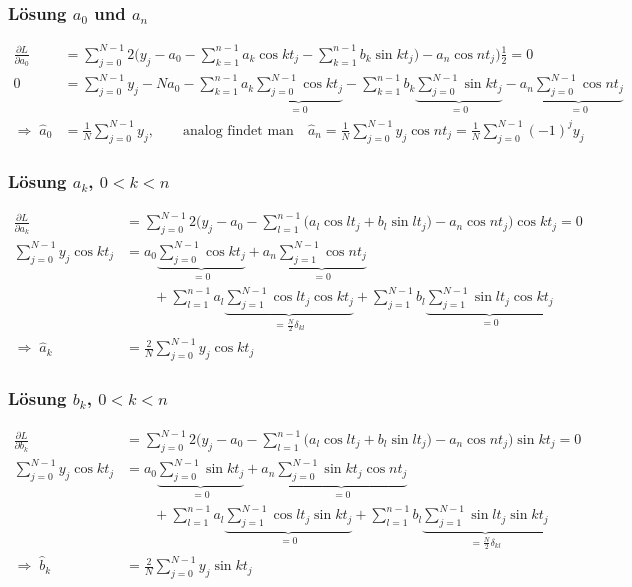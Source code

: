 %
%
\begin{frame}
\frametitle{Lösung $a_0$ und $a_n$}
\begin{align*}
\frac{\partial L}{\partial a_0}
&=
\sum_{j=0}^{N-1} 2\biggl(y_j-a_0
-\sum_{k=1}^{n-1}
a_k\cos kt_j
-\sum_{k=1}^{n-1}
b_k\sin kt_j\bigr)
-
a_n\cos nt_j
\biggr)\frac12=0
\\
0
&=
\sum_{j=0}^{N-1} y_j - Na_0
-\sum_{k=1}^{n-1}
a_k\underbrace{\sum_{j=0}^{N-1}\cos kt_j}_{\displaystyle=0}
-\sum_{k=1}^{n-1}
b_k\underbrace{\sum_{j=0}^{N-1}\sin kt_j}_{\displaystyle=0}
-
a_n\underbrace{\sum_{j=0}^{N-1}\cos nt_j}_{\displaystyle=0}
\\
\Rightarrow\;
\hat a_0&=\frac{1}{N}\sum_{j=0}^{N-1} y_j,
\qquad
\text{analog findet man}
\quad
\hat a_n
=
\frac{1}{N}\sum_{j=0}^{N-1} y_j \cos nt_j
=
\frac{1}{N}\sum_{j=0}^{N-1} (-1)^jy_j
\end{align*}
\end{frame}

%
%
\begin{frame}
\frametitle{Lösung $a_k$, $0<k<n$}
\begin{align*}
\frac{\partial L}{\partial a_k}
&=
\sum_{j=0}^{N-1} 2\biggl(y_j-a_0-\sum_{l=1}^{n-1}
\bigl(a_l\cos lt_j + b_l\sin lt_j\bigr)
-a_n\cos nt_j
\biggr)\cos kt_j=0
\\
\sum_{j=0}^{N-1}y_j\cos kt_j
&=
a_0\underbrace{\sum_{j=0}^{N-1}\cos kt_j}_{\displaystyle=0}
+
a_n
\underbrace{
\sum_{j=1}^{N-1}\cos nt_j
}_{\displaystyle=0}
\\
&\qquad
+
\sum_{l=1}^{n-1}
a_l
\underbrace{
\sum_{j=1}^{N-1}
\cos lt_j
\cos kt_j
}_{\displaystyle=\frac{N}{2}\delta_{kl}}
+
\sum_{j=1}^{N-1}
b_l
\underbrace{
\sum_{j=1}^{N-1}
\sin lt_j
\cos kt_j
}_{\displaystyle=0}
\\[-5pt]
\Rightarrow\;
\hat a_k&=\frac{2}{N}\sum_{j=0}^{N-1}y_j\cos kt_j
\end{align*}
\end{frame}

%
%
\begin{frame}
\frametitle{Lösung $b_k$, $0<k<n$}
\begin{align*}
\frac{\partial L}{\partial b_k}
&=
\sum_{j=0}^{N-1} 2\biggl(y_j-a_0-\sum_{l=1}^{n-1}
\bigl(a_l\cos lt_j + b_l\sin lt_j\bigr)
-a_n\cos nt_j
\biggr)\sin kt_j=0
\\
\sum_{j=0}^{N-1}y_j\cos kt_j
&=
a_0\underbrace{\sum_{j=0}^{N-1}\sin kt_j}_{\displaystyle=0}
+
a_n\underbrace{\sum_{j=0}^{N-1}\sin kt_j\cos nt_j}_{\displaystyle=0}
\\
&\qquad
+
\sum_{l=1}^{n-1}
a_l
\underbrace{
\sum_{j=1}^{N-1}
\cos lt_j
\sin kt_j
}_{\displaystyle=0}
+
\sum_{l=1}^{n-1}
b_l
\underbrace{
\sum_{j=1}^{N-1}
\sin lt_j
\sin kt_j
}_{\displaystyle=\frac{N}{2}\delta_{kl}}
\\[-5pt]
\Rightarrow\;
\hat b_k&=\frac{2}{N}\sum_{j=0}^{N-1}y_j\sin kt_j
\end{align*}
\end{frame}

